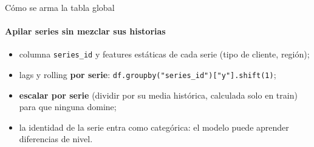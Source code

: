 \documentclass[aspectratio=169,11pt]{beamer}  %
\begin{document}
\begin{frame}{Cómo se arma la tabla global}
\framesubtitle{Apilar series sin mezclar sus historias}
\centering
{}
\par\vspace{4pt}
\raggedright\small
\begin{itemize}
\item columna \texttt{series\_id} y features estáticas de cada serie (tipo de cliente, región);
\item lags y rolling \textbf{por serie}: \texttt{df.groupby("series\_id")["y"].shift(1)};
\item \textbf{escalar por serie} (dividir por su media histórica, calculada solo en train) para que ninguna domine;
\item la identidad de la serie entra como categórica: el modelo puede aprender diferencias de nivel.
\end{itemize}
\end{frame}
\end{document}
